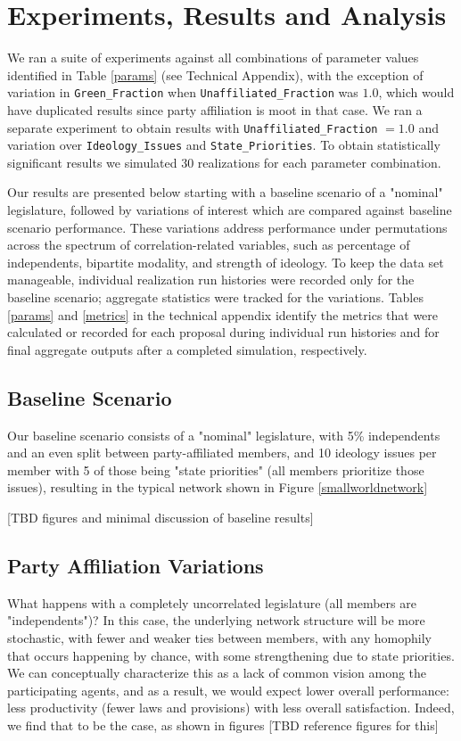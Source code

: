 \documentclass[pdftex,12pt]{llncs}
\begin{document}
\section{Experiments, Results and Analysis}

We ran a suite of experiments against all combinations of parameter values identified in Table \ref{params} (see Technical Appendix), with the exception of variation in \texttt{Green\_Fraction} when \texttt{Unaffiliated\_Fraction} was $1.0$, which would have duplicated results since party affiliation is moot in that case.
We ran a separate experiment to obtain results with \texttt{Unaffiliated\_Fraction} $= 1.0$ and variation over \texttt{Ideology\_Issues} and \texttt{State\_Priorities}.  
To obtain statistically significant results we simulated 30 realizations for each parameter combination.

Our results are presented below starting with a baseline scenario of a "nominal" legislature, followed by variations of interest which are compared against baseline scenario performance.  These variations address performance under permutations across the spectrum of correlation-related variables, such as percentage of independents, bipartite modality, and strength of ideology.  To keep the data set manageable, individual realization run histories were recorded only for the baseline scenario; aggregate statistics were tracked for the variations.  Tables \ref{params} and \ref{metrics} in the technical appendix identify the metrics that were calculated or recorded for each proposal during individual run histories and for final aggregate outputs after a completed simulation, respectively.

\subsection{Baseline Scenario}
Our baseline scenario consists of a "nominal" legislature, with 5\% independents and an even split between party-affiliated members, and 10 ideology issues per member with 5 of those being "state priorities" (all members prioritize those issues), resulting in the typical network shown in Figure \ref{smallworldnetwork}

[TBD figures and minimal discussion of baseline results]  

\subsection{Party Affiliation Variations}
What happens with a completely uncorrelated legislature (all members are "independents")?  In this case, the underlying network structure will be more stochastic, with fewer and weaker ties between members, with any homophily that occurs happening by chance, with some strengthening due to state priorities.  We can conceptually characterize this as a lack of common vision among the participating agents, and as a result, we would expect lower overall performance: less productivity (fewer laws and provisions) with less overall satisfaction.  Indeed, we find that to be the case, as shown in figures [TBD reference figures for this]
\end{document}
